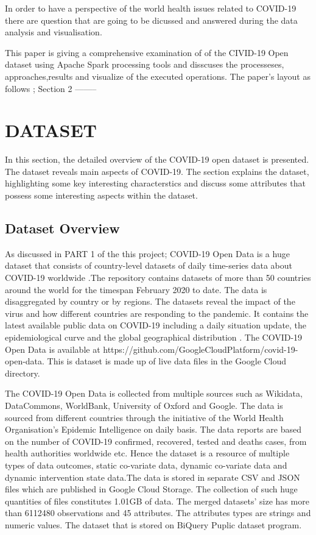 \documentclass[11pt]{article}
\begin{document}
 In order to  have a perspective of the world health issues related to COVID-19 there are question that are going to be dicussed and answered during the data analysis and visualisation.
 
 This paper is giving a comprehensive examination of of the CIVID-19 Open dataset using Apache Spark processing tools and disscuses the processeses, approaches,results and visualize of the executed operations. The paper's layout as follows ; Section 2 --------

\section{DATASET}
 In this  section, the detailed overview of the COVID-19 open dataset is presented. The dataset reveals main aspects of COVID-19. The section explains the dataset, highlighting some key interesting characterstics and discuss some attributes that possess some interesting aspects  within the dataset.

\subsection{Dataset Overview}

 As discussed in PART 1 of the this project;  COVID-19 Open Data is a huge dataset that consists of country-level datasets of daily time-series data about COVID-19 worldwide \cite{covid-19}.The repository contains datasets of more than 50 countries around the world for the timespan February 2020 to date. The data is disaggregated  by country or by regions. The datasets reveal the impact of the virus and how different countries are responding to the pandemic.  It contains the latest available public data on COVID-19 including a daily situation update, the epidemiological curve and the global geographical distribution \cite{covid-19}. The COVID-19 Open Data is available at https://github.com/GoogleCloudPlatform/covid-19-open-data. This is dataset is made up of live data files in the Google Cloud directory.

The COVID-19 Open Data is collected from multiple sources such as Wikidata, DataCommons, WorldBank, University of Oxford and Google. The data is sourced from different countries through the initiative of the World Health Organisation's Epidemic Intelligence on daily basis. The data reports are based on the number of COVID-19  confirmed, recovered, tested and deaths cases, from health authorities worldwide etc. Hence the dataset is a resource of multiple types of data outcomes, static co-variate data, dynamic co-variate data and dynamic intervention state data\cite{covid-19}.The data is stored in separate CSV and JSON files which are published in Google Cloud Storage. The collection of such huge quantities of files constitutes 1.01GB of data.  The merged datasets' size has  more than 6112480 observations and 45 attributes.  The attributes types are strings and numeric values. The dataset that is stored on BiQuery Puplic dataset program.
\end{document}
